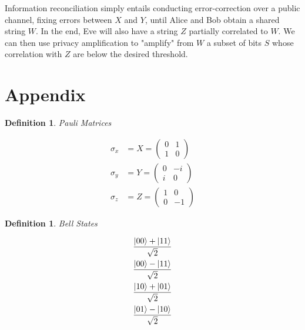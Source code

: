 \documentclass[11pt]{article}
\newcommand\0{\mathbf{0}}
\newcommand\<{\langle}
\renewcommand\>{\rangle}
\newtheorem{definition}[theorem]{Definition}
\begin{document}
Information reconciliation simply entails conducting error-correction over a public channel, fixing errors between $X$ and $Y$, until Alice and Bob obtain a shared string $W$. In the end, Eve will also have a string $Z$ partially correlated to $W$. We can then use privacy amplification to "amplify" from $W$ a subset of bits $S$ whose correlation with $Z$ are below the desired threshold. 

%
%

\section{Appendix}

\begin{definition}
\label{pauli}
Pauli Matrices

\begin{align*}
\sigma_x &= X = \begin{pmatrix} 0 & 1 \\ 1 & 0\end{pmatrix} \\
\sigma_y &= Y = \begin{pmatrix} 0 & -i \\ i & 0\end{pmatrix}\\
\sigma_z &= Z = \begin{pmatrix} 1 & 0 \\ 0 & -1\end{pmatrix}
\end{align*}
\end{definition}

\begin{definition}
\label{bellstates}
Bell States

\begin{align*}
\frac{\ket{00} + \ket{11} }{\sqrt{2}} \\	
\frac{\ket{00} - \ket{11} }{\sqrt{2}} \\	
\frac{\ket{10} + \ket{01} }{\sqrt{2}} \\	
\frac{\ket{01} - \ket{10} }{\sqrt{2}}
\end{align*}
\end{definition}
\end{document}

